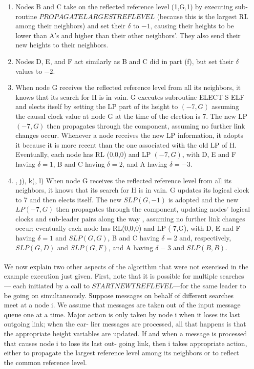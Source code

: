 \begin{enumerate}[label=\alph*)]
	\item Nodes B and C take on the reflected reference level (1,G,1) by executing sub- routine $PROPAGATELARGESTREFLEVEL$ (because this is the largest RL among their neighbors) and set their $\delta$ to $-1$, causing their heights to be lower than A’s and higher than their other neighbors’. They also send their new heights to their neighbors.
	\item Nodes D, E, and F act similarly as B and C did in part (f), but set their $\delta$ values to $-2$.
	\item When node G receives the reflected reference level from all its neighbors, it knows that its search for H is in vain. G executes subroutine ELECT S ELF and elects itself by setting the LP part of its height to $(-7,G)$ assuming the causal clock value at node G at the time of the election is 7. The new LP $(-7,G)$ then propagates through the component, assuming no further link changes occur. Whenever a node receives the new LP information, it adopts it because it is more recent than the one associated with the old LP of H. Eventually, each node has RL (0,0,0) and LP $(-7,G)$, with D, E and F having $\delta = 1$, B and C having $\delta = 2$, and A having $\delta = -3$.
	\item , j), k), l) When node G receives the reflected reference level from all its neighbors, it knows that its search for H is in vain. G updates its logical clock to 7 and then elects itself. The new $SLP(G,-1)$ is adopted and the new $LP(-7,G)$ then propagates through the component, updating nodes’ logical clocks and sub-leader pairs along the way , assuming no further link changes occur; eventually each node has RL(0,0,0) and LP (-7,G), with D, E and F having $\delta = 1$ and $SLP(G,G)$, B and C having $\delta = 2$ and, respectively, $SLP(G,D)$ and $SLP(G,F)$, and A having $\delta = 3$ and $SLP(B,B)$.
\end{enumerate}
\paragraph{}We now explain two other aspects of the algorithm that were not exercised in the example execution just given. First, note that it is possible for multiple searches— each initiated by a call to $STARTNEWTREFLEVEL$—for the same leader to be going on simultaneously. Suppose messages on behalf of different searches meet at a node i. We assume that messages are taken out of the input message queue one at a time. Major action is only taken by node i when it loses its last outgoing link; when the ear- lier messages are processed, all that happens is that the appropriate height variables are updated. If and when a message is processed that causes node i to lose its last out- going link, then i takes appropriate action, either to propagate the largest reference level among its neighbors or to reflect the common reference level.

